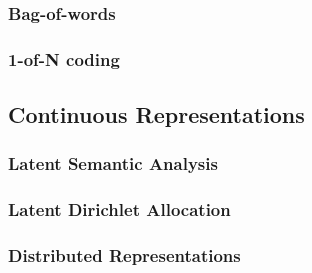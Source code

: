 \subsubsection{Bag-of-words}
\label{sec:rel_bow}

\subsubsection{1-of-N coding}
\label{sec:1_of_coding}

\subsection{Continuous Representations}
\label{sec:sub_continuous_representation}

\subsubsection{Latent Semantic Analysis}
\label{sec:rel_local_representation}

\subsubsection{Latent Dirichlet Allocation}
\label{sec:rel_lda}

\subsubsection{Distributed Representations}
\label{sec:dis_rep}





